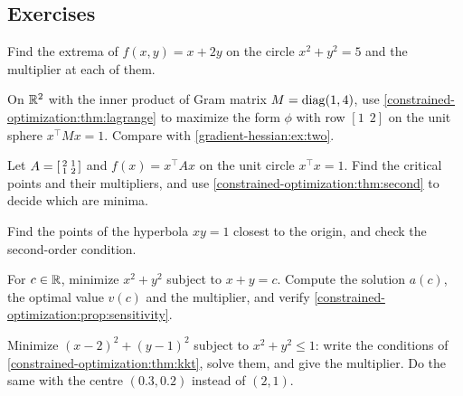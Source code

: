 \begin{notechapter}
\section*{Exercises}

\begin{exercise}\label{constrained-optimization:exr:1}
Find the extrema of $f(x, y) = x + 2y$ on the circle $x^2 + y^2 = 5$ and
the multiplier at each of them.
\end{exercise}

\begin{exercise}\label{constrained-optimization:exr:2}
On $\mathbb{R}^2$ with the inner product of Gram matrix $M = \operatorname{diag}(1, 4)$, use
\cref{constrained-optimization:thm:lagrange} to maximize the form $\phi$
with row $[1\ \ 2]$ on the unit sphere $x^\top Mx = 1$. Compare with
\cref{gradient-hessian:ex:two}.
\end{exercise}

\begin{exercise}\label{constrained-optimization:exr:3}
Let $A = \begin{bsmallmatrix}2 & 1\\1 & 2\end{bsmallmatrix}$ and
$f(x) = x^\top Ax$ on the unit circle $x^\top x = 1$. Find the critical
points and their multipliers, and use
\cref{constrained-optimization:thm:second} to decide which are minima.
\end{exercise}

\begin{exercise}\label{constrained-optimization:exr:4}
Find the points of the hyperbola $xy = 1$ closest to the origin, and
check the second-order condition.
\end{exercise}

\begin{exercise}\label{constrained-optimization:exr:5}
For $c\in\mathbb{R}$, minimize $x^2 + y^2$ subject to $x + y = c$. Compute the
solution $a(c)$, the optimal value $v(c)$ and the multiplier, and verify
\cref{constrained-optimization:prop:sensitivity}.
\end{exercise}

\begin{exercise}\label{constrained-optimization:exr:6}
Minimize $(x - 2)^2 + (y - 1)^2$ subject to $x^2 + y^2\leq1$: write the
conditions of \cref{constrained-optimization:thm:kkt}, solve them, and
give the multiplier. Do the same with the centre $(0.3, 0.2)$ instead of
$(2, 1)$.
\end{exercise}


\end{notechapter}
